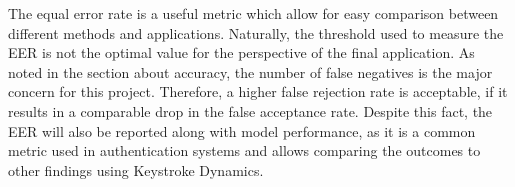 The equal error rate is a useful metric which allow for easy comparison between different methods and applications. Naturally, the threshold used to measure the EER is not the optimal value for the perspective of the final application. As noted in the section about accuracy, the number of false negatives is the major concern for this project. Therefore, a higher false rejection rate is acceptable, if it results in a comparable drop in the false acceptance rate. Despite this fact, the EER will also be reported along with model performance, as it is a common metric used in authentication systems and allows comparing the outcomes to other findings using Keystroke Dynamics.
